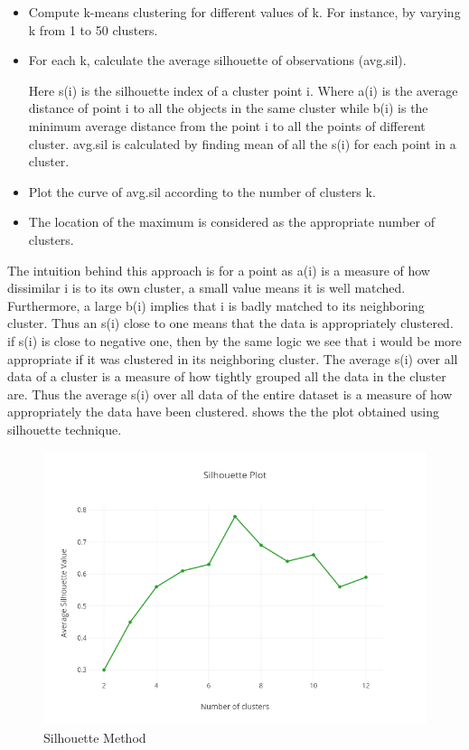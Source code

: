 	\begin{itemize}
		\item Compute k-means clustering for different values of k. For instance, by varying k from 1 to 50 clusters.
		\item For each k, calculate the average silhouette of observations (avg.sil).
		
		\begin{center}
		\end{center}
		Here s(i) is the silhouette index of a cluster point i. Where a(i) is the average distance of point i to all the objects in the same cluster while b(i) is the minimum average distance from the point i to all the points of different cluster. avg.sil is calculated by finding mean of all the s(i) for each point in a cluster.
		
		\item Plot the curve of avg.sil according to the number of clusters k.
		\item The location of the maximum is considered as the appropriate number of clusters.
	\end{itemize}
 
  The intuition behind this approach is for a point as a(i) is a measure of how dissimilar i is to its own cluster, a small value means it is well matched. Furthermore, a large b(i) implies that i is badly matched to its neighboring cluster. Thus an s(i) close to one means that the data is appropriately clustered. if s(i) is close to negative one, then by the same logic we see that i would be more appropriate if it was clustered in its neighboring cluster. The average s(i) over all data of a cluster is a measure of how tightly grouped all the data in the cluster are. Thus the average s(i) over all data of the entire dataset is a measure of how appropriately the data have been clustered.  shows the the plot obtained using silhouette technique. 
 
 \begin{figure}[t]
 	\centerline{\includegraphics[scale = 0.6]{silhouette.png}}
 	\caption{Silhouette Method}%
 \end{figure}
 
